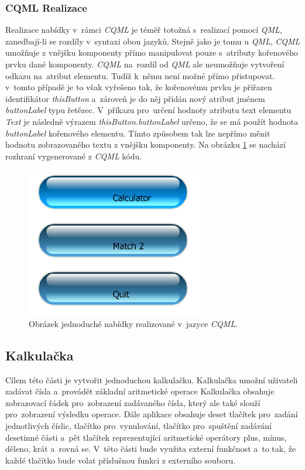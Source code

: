 \documentclass[11pt,twoside,a4paper]{book}
\begin{document}
\subsubsection{\label{SEC:CQMLMenu}CQML Realizace}
Realizace nabídky v~rámci \textit{CQML} je téměř totožná s~realizací pomocí \textit{QML}, zanedbají-li se rozdíly v~syntaxi obou jazyků.
Stejně jako je tomu u \textit{QML}, \textit{CQML} umožňuje z vnějšku komponenty přímo manipulovat pouze s~atributy kořenového prvku dané komponenty. \textit{CQML} na~rozdíl od \textit{QML} ale neumožňuje vytvoření odkazu na~atribut elementu. Tudíž k~němu není možné přímo přistupovat.  v~tomto případě je to však vyřešeno tak, že kořenovému prvku je přiřazen identifikátor \textit{thisButton} a~zároveň je do něj přidán nový atribut jménem \textit{buttonLabel} typu řetězec. V~příkazu pro~určení hodnoty atributu text elementu \textit{Text} je následně výrazem \textit{thisButton.buttonLabel} určeno, že se má použít hodnota \textit{buttonLabel} kořenového elementu. Tímto způsobem tak lze nepřímo měnit hodnotu zobrazovaného textu z vnějšku komponenty. Na obrázku \ref{fig:outMenuCQML} se nachází rozhraní vygenerované z \textit{CQML} kódu.
\begin{figure}[!ht]
\begin{center}
  \includegraphics[width=0.7\textwidth]{cqmlMenu}
\caption{{\label{fig:outMenuCQML}}Obrázek jednoduché nabídky realizované v~jazyce \textit{CQML}.}
\end{center}
\end{figure}

\subsection{Kalkulačka}
Cílem této části je vytvořit jednoduchou kalkulačku. Kalkulačka umožní uživateli zadávat čísla a~provádět základní aritmetické operace Kalkulačka obsahuje zobrazovací řádek pro~zobrazení zadávaného čísla, který ale také slouží pro~zobrazení výsledku operace. Dále aplikace obsahuje deset tlačítek pro~zadání jednotlivých číslic, tlačítko pro~vynulování, tlačítko pro~spuštění zadávání desetinné části a~pět tlačítek reprezentující aritmetické operátory plus, mínus, děleno, krát a~rovná se. V~této části bude využita externí funkčnost a~to tak, že každé tlačítko bude volat příslušnou funkci z externího souboru.
\end{document}
